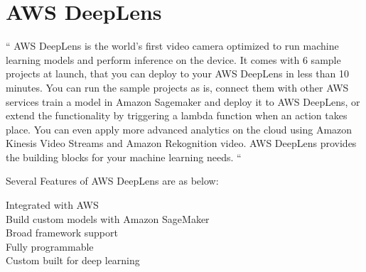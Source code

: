 \section{AWS DeepLens}

`` AWS DeepLens is the world's first video camera optimized to run machine
learning models and perform inference on the device. It comes with 6 sample
projects at launch, that you can deploy to your AWS DeepLens in less than
10 minutes. You can run the sample projects as is, connect them with other
AWS services train a model in Amazon Sagemaker and deploy it to AWS DeepLens,
or extend the functionality by triggering a lambda function when an action 
takes place. You can even apply more advanced analytics on the cloud using
Amazon Kinesis Video Streams and Amazon Rekognition video. 
AWS DeepLens provides the building blocks for your machine learning
needs. ``\cite{hid-sp18-522-deeplens}


Several Features of AWS DeepLens are as below: 

\begin{description}
	\item[Integrated with AWS]
	\item[Build custom models with Amazon SageMaker]
	\item[Broad framework support]
	\item[Fully programmable]
	\item[Custom built for deep learning]
	
\end{description}
